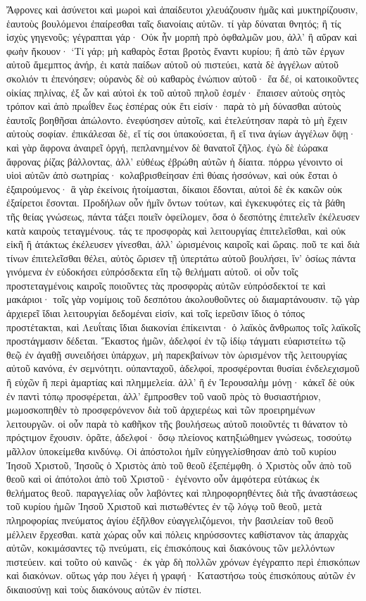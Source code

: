 Ἄφρονες καὶ ἀσύνετοι καὶ μωροὶ καὶ ἀπαίδευτοι χλευάζουσιν ἡμᾶς καὶ μυκτηρίζουσιν, ἑαυτοὺς βουλόμενοι ἐπαίρεσθαι ταῖς διανοίαις αὐτῶν. τί γὰρ δύναται θνητός; ἢ τίς ἰσχὺς γηγενοῦς; γέγραπται γάρ· Οὐκ ἦν μορπὴ πρὸ ὀφθαλμῶν μου, ἀλλ’ ἢ αὔραν καὶ φωὴν ἤκουον· ‘Τί γάρ; μὴ καθαρὸς ἔσται βροτὸς ἔναντι κυρίου; ἢ ἀπὸ τῶν ἐργων αὐτοῦ ἄμεμπτος ἀνήρ, ἐι κατὰ παίδων αὐτοῦ οὐ πιστεύει, κατὰ δὲ ἀγγέλων αὐτοῦ σκολιόν τι ἐπενόησεν; οὐρανὸς δὲ οὐ καθαρὸς ἐνώπιον αὐτοῦ· ἔα δέ, οἱ κατοικοῦντες οἰκίας πηλίνας, ἐξ ὧν καὶ αὐτοὶ ἐκ τοῦ αὐτοῦ πηλοῦ ἐσμέν· ἔπαισεν αὐτοὺς σητὸς τρόπον καὶ ἀπὸ πρωΐθεν ἕως ἑσπέρας οὐκ ἔτι εἰσίν· παρὰ τὸ μὴ δύνασθαι αὐτοὺς ἑαυτοῖς βοηθῆσαι ἀπώλοντο. ἐνεφύσησεν αὐτοῖς, καὶ ἐτελεύτησαν παρὰ τὸ μὴ ἔχειν αὐτοὺς σοφίαν. ἐπικάλεσαι δὲ, εἴ τίς σοι ὑπακούσεται, ἢ εἴ τινα ἁγίων ἀγγέλων ὄψῃ· καὶ γὰρ ἄφρονα ἀναιρεῖ ὀργή, πεπλανημένον δὲ θανατοῖ ζῆλος. ἐγὼ δὲ ἑώρακα ἄφρονας ῥίζας βάλλοντας, ἀλλ’ εὐθέως ἐβρώθη αὐτῶν ἡ δίαιτα. πόρρω γένοιντο οἱ υἱοὶ αὐτῶν ἀπὸ σωτηρίας· κολαβρισθείησαν ἐπὶ θύαις ἡσσόνων, καὶ οὐκ ἔσται ὁ ἐξαιρούμενος· ἃ γὰρ ἐκείνοις ἡτοίμασται, δίκαιοι ἔδονται, αὐτοὶ δὲ ἐκ κακῶν οὐκ ἐξαίρετοι ἔσονται.
Προδήλων οὖν ἡμῖν ὄντων τούτων, καὶ ἐγκεκυφότες εἰς τὰ βάθη τῆς θείας γνώσεως, πάντα τάξει ποιεῖν ὀφείλομεν, ὅσα ὁ δεσπότης ἐπιτελεῖν ἐκέλευσεν κατὰ καιροὺς τεταγμένους. τάς τε προσφορὰς καὶ λειτουργίας ἐπιτελεῖσθαι, καὶ οὐκ εἰκῆ ἢ ἀτάκτως ἐκέλευσεν γίνεσθαι, ἀλλ’ ὡρισμένοις καιροῖς καὶ ὥραις. ποῦ τε καὶ διὰ τίνων ἐπιτελεῖσθαι θέλει, αὐτὸς ὥρισεν τῇ ὑπερτάτω αὐτοῦ βουλήσει, ἵν’ ὁσίως πάντα γινόμενα ἐν εὐδοκήσει εὐπρόσδεκτα εἴη τῷ θελήματι αὐτοῦ. οἱ οὖν τοῖς προστεταγμένοις καιροῖς ποιοῦντες τὰς προσφορὰς αὐτῶν εὐπρόσδεκτοί τε καὶ μακάριοι· τοῖς γὰρ νομίμοις τοῦ δεσπότου ἀκολουθοῦντες οὐ διαμαρτάνουσιν. τῷ γὰρ ἀρχιερεῖ ἴδιαι λειτουργίαι δεδομέναι εἰσίν, καὶ τοῖς ἱερεῦσιν ἴδιος ὁ τόπος προστέτακται, καὶ Λευΐταις ἴδιαι διακονίαι ἐπίκεινται· ὁ λαϊκὸς ἄνθρωπος τοῖς λαϊκοῖς προστάγμασιν δέδεται.
Ἕκαστος ἡμῶν, ἀδελφοί ἐν τῷ ἰδίῳ τάγματι εὐαριστείτω τῷ θεῷ ἐν ἀγαθῇ συνειδήσει ὑπάρχων, μὴ παρεκβαίνων τὸν ὡρισμένον τῆς λειτουργίας αὐτοῦ κανόνα, ἐν σεμνότητι. οὐπανταχοῦ, ἀδελφοί, προσφέρονται θυσίαι ἐνδελεχισμοῦ ἢ εὐχῶν ἢ περὶ ἁμαρτίας καὶ πλημμελεία. ἀλλ’ ἢ ἐν Ἱερουσαλὴμ μόνῃ· κἀκεῖ δὲ οὐκ ἐν παντὶ τόπῳ προσφέρεται, ἀλλ’ ἔμπροσθεν τοῦ ναοῦ πρὸς τὸ θυσιαστήριον, μωμοσκοπηθὲν τὸ προσφερόνενον διὰ τοῦ ἀρχιερέως καὶ τῶν προειρημένων λειτουργῶν. οἱ οὖν παρὰ τὸ καθῆκον τῆς βουλήσεως αὐτοῦ ποιοῦντές τι θάνατον τὸ πρόςτιμον ἔχουσιν. ὁρᾶτε, ἀδελφοί· ὅσῳ πλείονος κατηξιώθημεν γνώσεως, τοσούτῳ μᾶλλον ὑποκείμεθα κινδύνῳ.
Οἱ ἀπόστολοι ἡμῖν εὐηγγελίσθησαν ἀπὸ τοῦ κυρίου Ἰησοῦ Χριστοῦ, Ἰησοῦς ὁ Χριστὸς ἀπὸ τοῦ θεοῦ ἐξεπέμφθη. ὁ Χριστὸς οὖν ἀπὸ τοῦ θεοῦ καὶ οἱ ἀπότολοι ἀπὸ τοῦ Χριστοῦ· ἐγένοντο οὖν ἀμφότερα εὐτάκως ἐκ θελήματος θεοῦ. παραγγελίας οὖν λαβόντες καὶ πληροφορηθέντες διὰ τῆς ἀναστάσεως τοῦ κυρίου ἡμῶν Ἰησοῦ Χριστοῦ καὶ πιστωθέντες ἐν τῷ λόγῳ τοῦ θεοῦ, μετὰ πληροφορίας πνεύματος ἁγίου ἐξῆλθον εὐαγγελιζόμενοι, τὴν βασιλείαν τοῦ θεοῦ μέλλειν ἔρχεσθαι. κατὰ χώρας οὖν καὶ πόλεις κηρύσσοντες καθίστανον τὰς ἀπαρχὰς αὐτῶν, κοκιμάσαντες τῷ πνεύματι, εἰς ἐπισκόπους καὶ διακόνους τῶν μελλόντων πιστεύειν. καὶ τοῦτο οὐ καινῶς· ἐκ γὰρ δὴ πολλῶν χρόνων ἐγέγραπτο περὶ ἐπισκόπων καὶ διακόνων. οὕτως γάρ που λέγει ἡ γραφή· Καταστήσω τοὺς ἐπισκόπους αὐτῶν ἐν δικαιοσύνῃ καὶ τοὺς διακόνους αὐτῶν ἐν πίστει.
